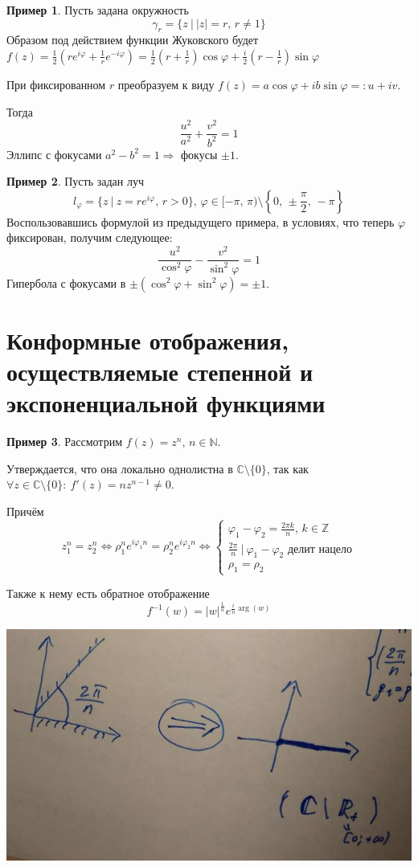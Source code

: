 \documentclass[a4paper,12pt]{article}
\renewcommand{\phi}{\ensuremath{\varphi}}
\theoremstyle{plain}
\theoremstyle{definition}
\newtheorem*{example}{Пример}
\theoremstyle{remark}
\begin{document}
\begin{example}
	Пусть задана окружность
	\[
		\gamma_r = \{z \:\vert\: \vert z\vert = r,\, r \neq 1\}
	\]
	Образом под действием функции Жуковского будет $f(z) = \frac{1}{2}\left(re^{i\phi} + \frac{1}{r}e^{-i\phi}\right) = \frac{1}{2}\left(r + \frac{1}{r}\right)\cos\phi + \frac{i}{2}\left(r - \frac{1}{r}\right)\sin\phi$

	При фиксированном $r$ преобразуем к виду $f(z) = a\cos\phi + ib\sin\phi =: u + iv$.

	Тогда
	\[
		\frac{u^2}{a^2} + \frac{v^2}{b^2} = 1
	\]
	Эллипс с фокусами $a^2 - b^2 = 1 \Rightarrow$ фокусы $\pm1$.
\end{example}

\begin{example}
	Пусть задан луч
	\[
		l_\phi = \{z \:\vert\: z = re^{i\phi},\, r > 0\},\, \phi \in [-\pi,\, \pi) \setminus \left\{0,\, \pm\frac{\pi}{2},\, -\pi\right\}
	\]
	Воспользовавшись формулой из предыдущего примера, в условиях, что теперь $\phi$ фиксирован, получим следующее:
	\[
		\frac{u^2}{\cos^2\phi} - \frac{v^2}{\sin^2 \phi} = 1
	\]
	Гипербола с фокусами в $\pm(\cos^2\phi + \sin^2\phi) = \pm1$.
\end{example}

\section{Конформные отображения, осуществляемые степенной и экспоненциальной функциями}
\begin{example}
	Рассмотрим $f(z) = z^n,\, n \in \mathbb{N}$.

	Утверждается, что она локально однолистна в $\mathbb{C} \setminus \{0\}$, так как $\forall z \in \mathbb{C} \setminus \{0\} :\: f'(z) = nz^{n - 1} \neq 0$.

	Причём
	\[
		z_1^n = z_2^n \Leftrightarrow \rho_1^ne^{i\phi_1n} = \rho_2^ne^{i\phi_2n} \Leftrightarrow
		\begin{cases}
			\phi_1 - \phi_2 = \frac{2\pi k}{n},\, k \in \mathbb{Z}         \\
			\frac{2\pi}{n} \:\vert\: \phi_1 - \phi_2 \text{  делит нацело} \\
			\rho_1 = \rho_2
		\end{cases}
	\]

	Также к нему есть обратное отображение
	\[
		f^{-1}(w) = \vert w\vert^{\frac{1}{n}}e^{\frac{i}{n}\arg(w)}
	\]

	\includegraphics[scale=0.3]{assets/power_ex.png}
\end{example}
\end{document}
